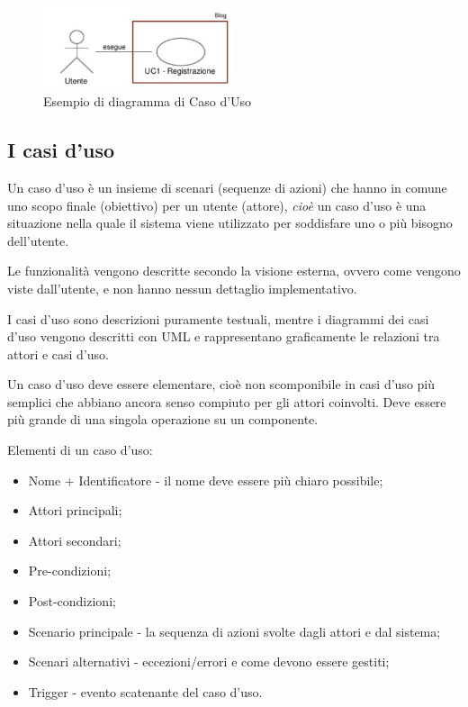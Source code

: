 \begin{figure}[H]
\centering
    \includegraphics[width=0.5\textwidth]{res/img/esempioDiagrammaUseCase}
    \caption{Esempio di diagramma di Caso d'Uso}
\end{figure}

\subsection{I casi d'uso}
Un caso d'uso è un insieme di scenari (sequenze di azioni) che hanno in comune uno scopo finale (obiettivo) per un utente (attore),
\textit{cioè} un caso d'uso è una situazione nella quale il sistema viene utilizzato per soddisfare uno o più bisogno dell'utente.

Le funzionalità vengono descritte secondo la visione esterna, ovvero come vengono viste dall'utente, e non hanno nessun dettaglio implementativo.

I casi d'uso sono descrizioni puramente testuali, mentre i diagrammi dei casi d'uso vengono descritti con UML e rappresentano graficamente le relazioni tra attori e casi d'uso.

Un caso d'uso deve essere elementare, cioè non scomponibile in casi d'uso più semplici che abbiano ancora senso compiuto per gli attori coinvolti. 
Deve essere più grande di una singola operazione su un componente. 

Elementi di un caso d'uso:
\begin{itemize}
\item Nome + Identificatore - il nome deve essere più chiaro possibile;
\item Attori principali;
\item Attori secondari;
\item Pre-condizioni;
\item Post-condizioni; 
\item Scenario principale - la sequenza di azioni svolte dagli attori e dal sistema;
\item Scenari alternativi - eccezioni/errori e come devono essere gestiti;
\item Trigger - evento scatenante del caso d'uso.
\end{itemize}

